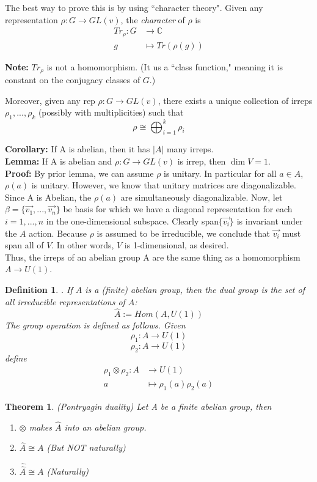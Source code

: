 \documentclass{article}
\newtheorem{thm}{Theorem}
\newtheorem*{dfn}{Definition}
\begin{document}
The best way to prove this is by using ``character theory".
Given any representation $\rho: G \to GL(v)$, the \emph{character} of $\rho$ is 
\[\begin{aligned}
Tr_\rho: G &\to \mathbb{C} \\
g &\mapsto Tr(\rho(g))
\end{aligned}\]

\textbf{Note:} $Tr_{\rho}$ is not a homomorphism.  (It us a ``class function," meaning it is constant on the conjugacy classes of $G$.)

Moreover, given any rep $\rho: G \to GL(v)$, there exists a unique collection of irreps $\rho_{1},...,\rho_{k}$ (possibly with multiplicities) such that 
\[\rho \cong \bigoplus_{i=1}^{k} \rho_{i}\]

\textbf{Corollary:} If A is abelian, then it has $|A|$ many irreps.\\

\textbf{Lemma:} If A is abelian and $\rho: G \to GL(v)$ is irrep, then $\dim V  = 1$. \\

\textbf{Proof:} By prior lemma, we can assume $\rho$ is unitary. In particular for all $a \in A$, $\rho(a)$ is unitary. However, we know that unitary matrices are diagonalizable. Since A is Abelian, the $\rho(a)$ are simultaneously diagonalizable. Now, let $\beta = \{\Vec{v_{1}},...,\Vec{v_{n}}\}$ be basis for which we have a diagonal representation for each $i = 1,...,n$ in the one-dimensional subspace. Clearly span$\{\Vec{v_{i}}\}$ is invariant under the $A$ action. Because $\rho$ is assumed to be irreducible, we conclude that $\Vec{v_i}$ must span all of $V$.  In other words, $V$ is 1-dimensional, as desired. \\

Thus, the irreps of an abelian group A are the same thing as a homomorphism $A \to U(1)$. \\

\begin{dfn}. If $A$ is a (finite) abelian group, then the \emph{dual group} is the set of all irreducible representations of $A$:
$$\hat{A}:= Hom(A,U(1))$$
The group operation is defined as follows.
Given
$$\rho_{1}: A\to U(1)$$
$$\rho_{2}: A\to U(1)$$
define
\[\begin{aligned}
\rho_{1} \otimes \rho_{2} : A&\to U(1)\\
a &\mapsto \rho_{1}(a)\rho_{2}(a)
\end{aligned}\]
\end{dfn}

\begin{thm}{(Pontryagin duality)}
    Let A be a finite abelian group, then
    \begin{enumerate}
        \item $\otimes$ makes $\hat{A}$ into an abelian group.
        \item $\hat{A} \cong A$ (But NOT naturally)
        \item $\hat{\hat{A}} \cong A$ (Naturally)
    \end{enumerate}
    
\end{thm}
\end{document}
